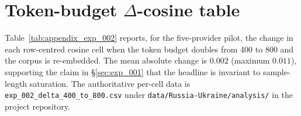 \section{Token-budget $\Delta$-cosine table}\label{sec:appendix_token_budget_delta}

Table~\ref{tab:appendix_exp_002} reports, for the five-provider
pilot, the change in each row-centred cosine cell when the token
budget doubles from 400 to 800 and the corpus is re-embedded. The
mean absolute change is $0.002$ (maximum $0.011$), supporting the
claim in \S\ref{sec:exp_001} that the headline is invariant to
sample-length saturation. The authoritative per-cell data is
\verb|exp_002_delta_400_to_800.csv| under
\verb|data/Russia-Ukraine/analysis/| in the project repository.

\begin{table}[!htbp]
  \centering
  \small
  \setlength{\tabcolsep}{3.5pt}
  \caption[Token-budget $\Delta$-cosine cube]{Per-cell change in
    row-centred cosine between the 400- and 800-token sweeps
    ($\Delta = c_{800} - c_{400}$). Columns are anchor languages
    grouped by response language.}
  \label{tab:appendix_exp_002}
\end{table}

